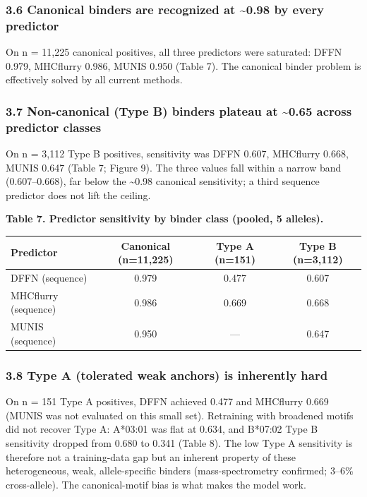\documentclass[10pt]{article}
\newcounter{none} %
\begin{document}
\subsubsection{3.6 Canonical binders are recognized at
\textasciitilde0.98 by every
predictor}\label{canonical-binders-are-recognized-at-0.98-by-every-predictor}

On n = 11,225 canonical positives, all three predictors were saturated:
DFFN 0.979, MHCflurry 0.986, MUNIS 0.950 (Table 7). The canonical binder
problem is effectively solved by all current methods.

\subsubsection{3.7 Non-canonical (Type B) binders plateau at
\textasciitilde0.65 across predictor
classes}\label{non-canonical-type-b-binders-plateau-at-0.65-across-predictor-classes}

On n = 3,112 Type B positives, sensitivity was DFFN 0.607, MHCflurry
0.668, MUNIS 0.647 (Table 7; Figure 9). The three values fall within a
narrow band (0.607--0.668), far below the \textasciitilde0.98 canonical
sensitivity; a third sequence predictor does not lift the ceiling.

\textbf{Table 7. Predictor sensitivity by binder class (pooled, 5
alleles).}

{\def\LTcaptype{none} %
\begin{longtable}[]{@{}lccc@{}}
\toprule\noalign{}
Predictor & Canonical (n=11,225) & Type A (n=151) & Type B (n=3,112) \\
\midrule\noalign{}
\endhead
\bottomrule\noalign{}
\endlastfoot
DFFN (sequence) & 0.979 & 0.477 & 0.607 \\
MHCflurry (sequence) & 0.986 & 0.669 & 0.668 \\
MUNIS (sequence) & 0.950 & --- & 0.647 \\
\end{longtable}
}

\subsubsection{3.8 Type A (tolerated weak anchors) is inherently
hard}\label{type-a-tolerated-weak-anchors-is-inherently-hard}

On n = 151 Type A positives, DFFN achieved 0.477 and MHCflurry 0.669
(MUNIS was not evaluated on this small set). Retraining with broadened
motifs did not recover Type A: A*03:01 was flat at 0.634, and B*07:02
Type B sensitivity dropped from 0.680 to 0.341 (Table 8). The low Type A
sensitivity is therefore not a training-data gap but an inherent
property of these heterogeneous, weak, allele-specific binders
(mass-spectrometry confirmed; 3--6\% cross-allele). The canonical-motif
bias is what makes the model work.
\end{document}
